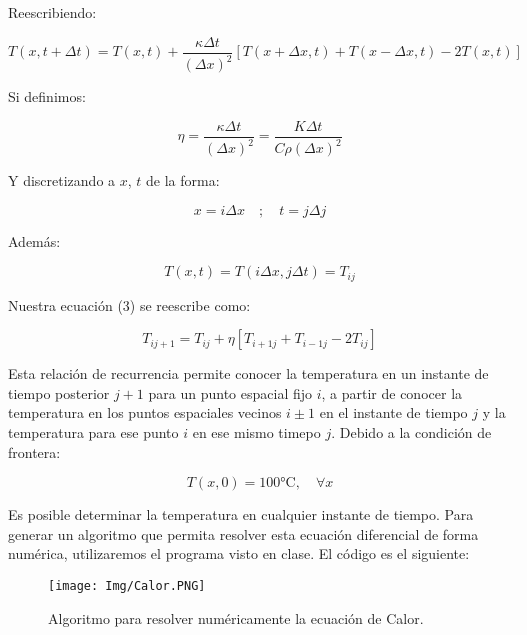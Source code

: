 \documentclass[11pt]{article}
\begin{document}
	Reescribiendo:
	
	\begin{equation}
		T(x, t + \Delta t) = T(x,t) + \frac{\kappa\Delta t}{(\Delta x)^2} \left[ T(x + \Delta x , t) + T(x - \Delta x,t) - 2T(x,t) \right] \label{3}
	\end{equation}
	
	Si definimos: 
	
	$$\eta = \frac{\kappa\Delta t}{(\Delta x)^2} = \frac{K \Delta t}{C\rho (\Delta x)^2}$$
	
	Y discretizando a $x$, $t$ de la forma:
	
	$$x = i \Delta x\quad;\quad t=j\Delta j$$
	
	Además:
	
	$$T(x,t)= T(i\Delta x , j \Delta t) = T_{ij}$$
	
	Nuestra ecuación (3) se reescribe como:
	
	\begin{equation}
		T_{ij+1} = T_{ij} + \eta \left[ T_{i+1 j } + T_{i-1 j} - 2T_{ij} \right]	\label{4}
	\end{equation}

	Esta relación de recurrencia permite conocer la temperatura en un instante de tiempo posterior $j+1$ para un punto espacial fijo $i$, a partir de conocer la temperatura en los puntos espaciales vecinos $i\pm1 $ en el instante de tiempo $j$ y la temperatura para ese punto $i$ en ese mismo timepo $j$. Debido a la condición de frontera:
	
	$$T(x ,0) = 100 \text{°C},\quad \forall x$$
	
	Es posible determinar la temperatura en cualquier instante de tiempo.  
	Para generar un algoritmo que permita resolver esta ecuación diferencial de forma numérica, utilizaremos el programa visto en clase. El código es el siguiente:
	\begin{figure}[h]
		\centering
		\texttt{[image: Img/Calor.PNG]}
		\caption{Algoritmo para resolver numéricamente la ecuación de Calor.}
		\label{A1}
	\end{figure}
	
\end{document}
